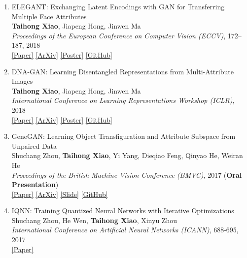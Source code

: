 \documentclass[letterpaper]{article}
\begin{document}
\begin{enumerate}
\item ELEGANT: Exchanging Latent Encodings with GAN for Transferring Multiple Face Attributes\\
	{\bf Taihong Xiao}, Jiapeng Hong, Jinwen Ma\\
	{\it Proceedings of the European Conference on Computer Vision (ECCV)}, 172--187, 2018\\
	\href{http://openaccess.thecvf.com/content_ECCV_2018/papers/Taihong_Xiao_ELEGANT_Exchanging_Latent_ECCV_2018_paper.pdf}{[Paper]}
	\href{https://arxiv.org/abs/1803.10562}{[ArXiv]}
	\href{https://prinsphield.github.io/ECCV-2018/poster/poster.pdf}{[Poster]}
	\href{https://github.com/Prinsphield/ELEGANT}{[GitHub]}
	
\item DNA-GAN: Learning Disentangled Representations from Multi-Attribute Images\\
	{\bf Taihong Xiao}, Jiapeng Hong, Jinwen Ma\\
	{\it International Conference on Learning Representations Workshop (ICLR)}, 2018\\
	\href{https://openreview.net/pdf?id=rkX1FF_UM}{[Paper]} 
	\href{https://arxiv.org/abs/1711.05415v2}{[ArXiv]}
	\href{https://prinsphield.github.io/ICLR-2018/poster/poster.pdf}{[Poster]}
	\href{https://github.com/Prinsphield/DNA-GAN}{[GitHub]}
	
\item GeneGAN: Learning Object Transfiguration and Attribute Subspace from Unpaired Data\\
	Shuchang Zhou, {\bf Taihong Xiao}, Yi Yang, Dieqiao Feng, Qinyao He, Weiran He\\
	{\it Proceedings of the British Machine Vision Conference (BMVC)}, 2017 ({\bf Oral Presentation})\\
	\href{https://www.dropbox.com/s/3qofizvcfi4pa0f/0520.pdf?dl=1}{[Paper]}
	\href{http://arxiv.org/abs/1705.04932}{[ArXiv]}
	\href{http://zsc.github.io/GeneGAN-BMVC2017.pdf}{[Slide]}
	\href{https://github.com/Prinsphield/GeneGAN}{[GitHub]}

\item IQNN: Training Quantized Neural Networks with Iterative Optimizations\\
	Shuchang Zhou, He Wen, {\bf Taihong Xiao}, Xinyu Zhou\\
	{\it International Conference on Artificial Neural Networks (ICANN)},  688-695, 2017\\
	\href{https://link.springer.com/chapter/10.1007\%2F978-3-319-68612-7_78}{[Paper]} 


\end{enumerate}
\end{document}
